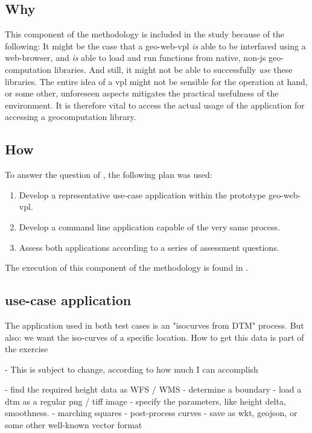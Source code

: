 
\subsection{Why}
This component of the methodology is included in the study because of the following: 
It might be the case that a geo-web-vpl \emph{is} able to be interfaced using a web-browser, and \emph{is} able to load and run functions from native, non-js geo-computation libraries. 
And still, it might not be able to successfully \emph{use} these libraries. 
The entire idea of a vpl might not be sensible for the operation at hand, or some other, unforeseen aspects mitigates the practical usefulness of the environment. 
It is therefore vital to access the actual usage of the application for accessing a geocomputation library.

\subsection{How}
To answer the question of \mySubRQFourTitle, the following plan was used: 
\begin{enumerate}[-]
  \item Develop a representative use-case application within the prototype \ac{geo-web-vpl}.
  \item Develop a command line application capable of the very same process.
  \item Assess both applications according to a series of assessment questions.
\end{enumerate}

The execution of this component of the methodology is found in .

\subsection{use-case application}
The application used in both test cases is an "isocurves from DTM" process. 
But also: we want the iso-curves of a specific location. How to get this data is part of the exercise

\begin{note}
- This is subject to change, according to how much I can accomplish 

- find the required height data as WFS / WMS
- determine a boundary
- load a dtm as a regular png / tiff image
- specify the parameters, like height delta, smoothness.
- marching squares
- post-process curves
- save as wkt, geojson, or some other well-known vector format


\end{note}

